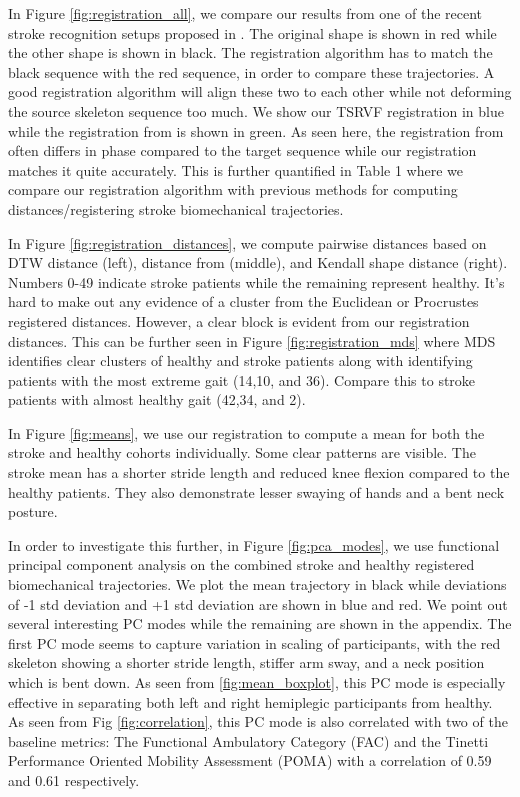 \documentclass{article}
\begin{document}
In Figure \ref{fig:registration_all}, we compare our results from one of the recent stroke recognition setups proposed in \cite{eichler20183d}. The original shape is shown in red while the other shape is shown in black. The registration algorithm has to match the black sequence with the red sequence, in order to compare these trajectories. A good registration algorithm will align these two to each other while not deforming the source skeleton sequence too much. We show our TSRVF registration in blue while the registration from \cite{eichler20183d} is shown in green. As seen here, the registration from \cite{eichler20183d} often differs in phase compared to the target sequence while our registration matches it quite accurately. This is further quantified in Table 1 where we compare our registration algorithm with previous methods for computing distances/registering stroke biomechanical trajectories.

In Figure \ref{fig:registration_distances}, we compute pairwise distances based on DTW distance (left), distance from \cite{eichler20183d} (middle), and Kendall shape distance (right). Numbers 0-49 indicate stroke patients while the remaining represent healthy. It's hard to make out any evidence of a cluster from the Euclidean or Procrustes registered distances. However, a clear block is evident from our registration distances. This can be further seen in Figure \ref{fig:registration_mds} where MDS identifies clear clusters of healthy and stroke patients along with identifying patients with the most extreme gait (14,10, and 36). Compare this to stroke patients with almost healthy gait (42,34, and 2).

In Figure \ref{fig:means}, we use our registration to compute a mean for both the stroke and healthy cohorts individually. Some clear patterns are visible. The stroke mean has a shorter stride length and reduced knee flexion compared to the healthy patients. They also demonstrate lesser swaying of hands and a bent neck posture.

In order to investigate this further, in Figure \ref{fig:pca_modes}, we use functional principal component analysis on the combined stroke and healthy registered biomechanical trajectories. We plot the mean trajectory in black while deviations of -1 std deviation and +1 std deviation are shown in blue and red. We point out several interesting PC modes while the remaining are shown in the appendix. The first PC mode seems to capture variation in scaling of participants, with the red skeleton showing a shorter stride length, stiffer arm sway, and a neck position which is bent down. As seen from \ref{fig:mean_boxplot}, this PC mode is especially effective in separating both left and right hemiplegic participants from healthy. As seen from Fig \ref{fig:correlation}, this PC mode is also correlated with two of the baseline metrics: The Functional Ambulatory Category (FAC) and the Tinetti Performance Oriented Mobility Assessment (POMA) with a correlation of 0.59 and 0.61 respectively.
\end{document}
